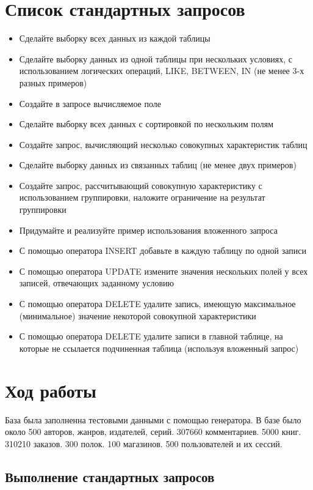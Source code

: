 \documentclass[a4paper,14pt]{extarticle}
\begin{document}
\section{Список стандартных запросов}
\begin{itemize}
\item Сделайте выборку всех данных из каждой таблицы
\item Сделайте выборку данных из одной таблицы при нескольких условиях, с использованием логических операций, LIKE, BETWEEN, IN (не менее 3-х разных примеров)
\item Создайте в запросе вычисляемое поле
\item Сделайте выборку всех данных с сортировкой по нескольким полям
\item Создайте запрос, вычисляющий несколько совокупных характеристик таблиц
\item Сделайте выборку данных из связанных таблиц (не менее двух примеров)
\item Создайте запрос, рассчитывающий совокупную характеристику с использованием группировки, наложите ограничение на результат группировки
\item Придумайте и реализуйте пример использования вложенного запроса
\item С помощью оператора INSERT добавьте в каждую таблицу по одной записи
\item С помощью оператора UPDATE измените значения нескольких полей у всех записей, отвечающих заданному условию
\item С помощью оператора DELETE удалите запись, имеющую максимальное (минимальное) значение некоторой совокупной характеристики
\item С помощью оператора DELETE удалите записи в главной таблице, на которые не ссылается подчиненная таблица (используя вложенный запрос)
\end{itemize}

\section{Ход работы}

База была заполненна тестовыми данными с помощью генератора.
В базе было около 500 авторов, жанров, издателей, серий. 307660 комментариев. 5000 книг. 310210 заказов. 300 полок. 100 магазинов. 500 пользователей и их сессий.

\subsection{Выполнение стандартных запросов}
\end{document}
